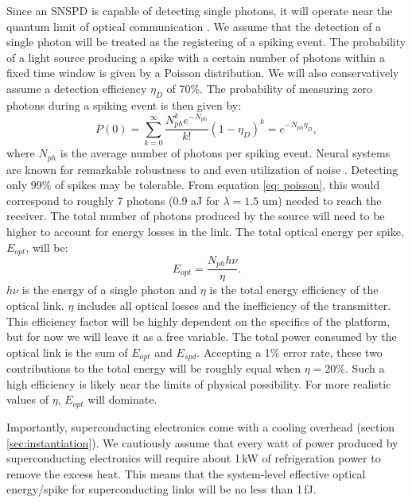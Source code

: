 \documentclass[twocolumn]{article}
\begin{document}
Since an SNSPD is capable of detecting single photons, it will operate near the quantum limit of optical communication \cite{razavi2012design}. We assume that the detection of a single photon will be treated as the registering of a spiking event. The probability of a light source producing a spike with a certain number of photons within a fixed time window is given by a Poisson distribution. We will also conservatively assume a detection efficiency $\eta_D$ of 70\%. The probability of measuring zero photons during a spiking event is then given by:
\begin{equation}
    P(0) = \sum_{k=0}^{\infty} \frac{N_{ph}^k e^{-N_{ph}}}{k!}(1-\eta_D)^{k} = e^{-N_{ph}\eta_D},
\label{eq: poisson}
\end{equation}
where $N_{ph}$ is the average number of photons per spiking event. Neural systems are known for remarkable robustness to and even utilization of noise \cite{stein2005neuronal, mcdonnell2011benefits}. Detecting only 99\% of spikes may be tolerable. From equation \ref{eq: poisson}, this would correspond to roughly 7 photons (0.9 aJ for $\lambda = 1.5$ um) needed to reach the receiver. The total number of photons produced by the source will need to be higher to account for energy losses in the link. The total optical energy per spike, $E_{opt}$, will be:
\begin{equation}
    E_{opt} = \frac{N_{ph} h \nu}{\eta}.
\end{equation}
$h\nu$ is the energy of a single photon and $\eta$ is the total energy efficiency of the optical link. $\eta$ includes all optical losses and the inefficiency of the transmitter. This efficiency factor will be highly dependent on the specifics of the platform, but for now we will leave it as a free variable. The total power consumed by the optical link is the sum of $E_{opt}$ and $E_{spd}$. Accepting a 1\% error rate, these two contributions to the total energy will be roughly equal when $\eta = 20\%$. Such a high efficiency is likely near the limits of physical possibility. For more realistic values of $\eta$, $E_{opt}$ will dominate.

Importantly, superconducting electronics come with a cooling overhead (section \ref{sec:instantiation}). We cautiously assume that every watt of power produced by superconducting electronics will require about 1\,kW of refrigeration power to remove the excess heat. This means that the system-level effective optical energy/spike for superconducting links will be no less than 1\,fJ.
\end{document}
